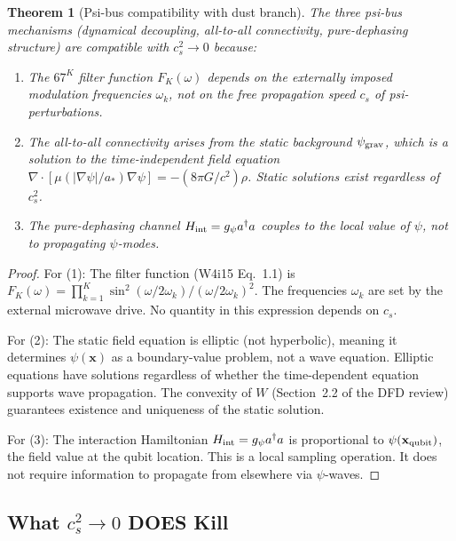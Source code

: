 \documentclass[11pt]{article}
\newtheorem{theorem}{Theorem}[section]
\theoremstyle{definition}
\theoremstyle{remark}
\newcommand{\psigrav}{\psi_{\rm grav}}
\begin{document}
\begin{theorem}[Psi-bus compatibility with dust branch]
  \label{thm:psi-bus-dust}
  The three psi-bus mechanisms (dynamical decoupling, all-to-all connectivity,
  pure-dephasing structure) are compatible with $c_s^2 \to 0$ because:
  \begin{enumerate}
    \item The $67^K$ filter function $F_K(\omega)$ depends on the externally
      imposed modulation frequencies $\omega_k$, not on the free propagation
      speed $c_s$ of psi-perturbations.
    \item The all-to-all connectivity arises from the \emph{static} background
      $\psigrav$, which is a solution to the time-independent field equation
      $\nabla \cdot [\mu(|\nabla\psi|/a_*) \nabla\psi] = -(8\pi G/c^2)\rho$.
      Static solutions exist regardless of $c_s^2$.
    \item The pure-dephasing channel $H_{\rm int} = g_\psi a^\dagger a$
      couples to the \emph{local value} of $\psi$, not to propagating
      $\psi$-modes.
  \end{enumerate}
\end{theorem}

\begin{proof}
  For (1): The filter function (W4i15 Eq.~1.1) is $F_K(\omega) = \prod_{k=1}^K
  \sin^2(\omega/2\omega_k)/(\omega/2\omega_k)^2$.  The frequencies $\omega_k$
  are set by the external microwave drive.  No quantity in this expression
  depends on $c_s$.

  For (2): The static field equation is elliptic (not hyperbolic), meaning
  it determines $\psi(\mathbf{x})$ as a boundary-value problem, not a wave
  equation.  Elliptic equations have solutions regardless of whether the
  time-dependent equation supports wave propagation.  The convexity of $W$
  (Section~2.2 of the DFD review) guarantees existence and uniqueness of
  the static solution.

  For (3): The interaction Hamiltonian $H_{\rm int} = g_\psi a^\dagger a$
  is proportional to $\psi(\mathbf{x}_{\rm qubit})$, the field value at the
  qubit location.  This is a local sampling operation.  It does not require
  information to propagate from elsewhere via $\psi$-waves.
\end{proof}

\subsection{What $c_s^2 \to 0$ DOES Kill}
\end{document}
